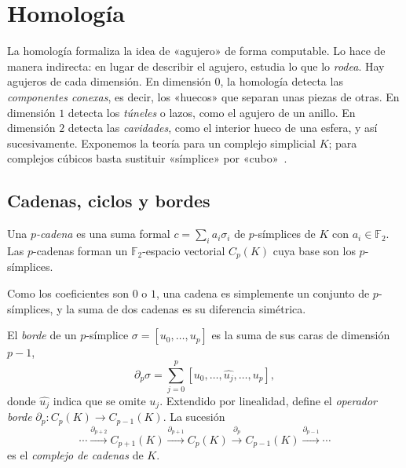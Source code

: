 \section{Homología}
\label{sec:homologia}

La homología formaliza la idea de «agujero» de forma computable. Lo hace de
manera indirecta: en lugar de describir el agujero, estudia lo que lo
\emph{rodea}. Hay agujeros de cada dimensión. En dimensión $0$, la
homología detecta las \emph{componentes conexas}, es decir, los «huecos»
que separan unas piezas de otras. En dimensión $1$ detecta los
\emph{túneles} o lazos, como el agujero de un anillo. En dimensión $2$
detecta las \emph{cavidades}, como el interior hueco de una esfera, y así
sucesivamente. Exponemos la teoría para un complejo simplicial $K$; para
complejos cúbicos basta sustituir «símplice» por «cubo»~\cite{kaczynski2004}.

\subsection{Cadenas, ciclos y bordes}

\begin{definicion}
Una \emph{$p$-cadena} es una suma formal $c=\sum_i a_i\sigma_i$ de
$p$-símplices de $K$ con $a_i\in\mathbb{F}_2$. Las $p$-cadenas forman un
$\mathbb{F}_2$-espacio vectorial $C_p(K)$ cuya base son los $p$-símplices.
\end{definicion}

Como los coeficientes son $0$ o $1$, una cadena es simplemente un
conjunto de $p$-símplices, y la suma de dos cadenas es su diferencia
simétrica.

\begin{definicion}
El \emph{borde} de un $p$-símplice $\sigma=[u_0,\dots,u_p]$ es la suma de
sus caras de dimensión $p-1$,
\[
  \partial_p\sigma=\sum_{j=0}^{p}[u_0,\dots,\widehat{u_j},\dots,u_p],
\]
donde $\widehat{u_j}$ indica que se omite $u_j$. Extendido por linealidad,
define el \emph{operador borde} $\partial_p:C_p(K)\to C_{p-1}(K)$. La
sucesión
\[
  \cdots\xrightarrow{\partial_{p+2}} C_{p+1}(K)\xrightarrow{\partial_{p+1}}
  C_p(K)\xrightarrow{\partial_p} C_{p-1}(K)\xrightarrow{\partial_{p-1}}\cdots
\]
es el \emph{complejo de cadenas} de $K$.
\end{definicion}

